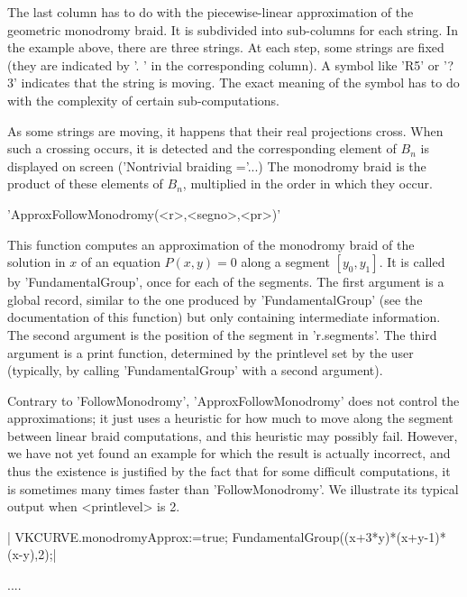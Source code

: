 The last column has to do with the piecewise-linear approximation of the
geometric monodromy  braid. It is  subdivided into sub-columns  for each
string. In  the example above,  there are  three strings. At  each step,
some strings are fixed (they are  indicated by '. ' in the corresponding
column). A symbol like 'R5' or '?3' indicates that the string is moving.
The exact meaning of the symbol has to do with the complexity of certain
sub-computations.

As  some strings  are moving,  it  happens that  their real  projections
cross. When such a crossing occurs, it is detected and the corresponding
element of $B_n$ is displayed on screen ('Nontrivial braiding ='...) The
monodromy braid is the product of these elements of $B_n$, multiplied in
the order in which they occur.


'ApproxFollowMonodromy(<r>,<segno>,<pr>)'

This function  computes an approximation  of the monodromy braid  of the
solution in $x$  of an equation $P(x,y)=0$ along  a segment $[y_0,y_1]$.
It is called  by 'FundamentalGroup', once for each of  the segments. The
first  argument is  a  global record,  similar to  the  one produced  by
'FundamentalGroup'  (see the  documentation of  this function)  but only
containing intermediate information. The second argument is the position
of the segment in 'r.segments'. The  third argument is a print function,
determined  by the  printlevel set  by the  user (typically,  by calling
'FundamentalGroup' with a second argument).

Contrary to 'FollowMonodromy',  'ApproxFollowMonodromy' does not control
the approximations; it just uses a  heuristic for how much to move along
the segment  between linear braid  computations, and this  heuristic may
possibly fail. However,  we have not yet found an  example for which the
result is actually incorrect, and thus the existence is justified by the
fact that  for some difficult  computations, it is sometimes  many times
faster  than 'FollowMonodromy'.  We illustrate  its typical  output when
<printlevel> is 2.

|   VKCURVE.monodromyApprox:=true;
    FundamentalGroup((x+3*y)*(x+y-1)*(x-y),2);|

  ....

